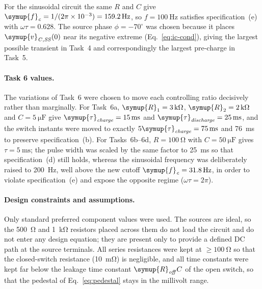 \documentclass[12pt,a4paper]{article}
\begin{document}
	For the sinusoidal circuit the same $R$ and $C$ give
	$\symup{f}_{\mathit{c}} = 1/(2\pi \times 10^{-3}) = \SI{159.2}{\hertz}$, so
	$f = \SI{100}{\hertz}$ satisfies specification~(e) with
	$\omega\tau = 0.628$.  The source phase $\phi = -70^{\circ}$ was chosen
	because it places $\symup{v}_{\mathit{C,SS}}(0)$ near its negative extreme
	(Eq.~\eqref{eq:ic-cond}), giving the largest possible transient in
	Task~4 and correspondingly the largest pre-charge in Task~5.
	
	\paragraph{Task 6 values.}
	The variations of Task~6 were chosen to move each controlling ratio
	decisively rather than marginally.  For Task~6a,
	$\symup{R}_{1} = \SI{3}{\kilo\ohm}$, $\symup{R}_{2} = \SI{2}{\kilo\ohm}$ and
	$C = \SI{5}{\micro\farad}$ give
	$\symup{\tau}_{\mathit{charge}} = \SI{15}{\milli\second}$ and
	$\symup{\tau}_{\mathit{discharge}} = \SI{25}{\milli\second}$, and the switch
	instants were moved to exactly $5\symup{\tau}_{\mathit{charge}} =
	\SI{75}{\milli\second}$ and \SI{76}{\milli\second} to preserve
	specification~(b).  For Tasks~6b--6d, $R = \SI{100}{\ohm}$ with
	$C = \SI{50}{\micro\farad}$ gives $\tau = \SI{5}{\milli\second}$; the
	pulse width was scaled by the same factor to
	\SI{25}{\milli\second} so that specification~(d) still holds, whereas
	the sinusoidal frequency was deliberately raised to
	\SI{200}{\hertz}, well above the new cutoff
	$\symup{f}_{\mathit{c}} = \SI{31.8}{\hertz}$, in order to violate
	specification~(e) and expose the opposite regime ($\omega\tau = 2\pi$).
	
	\paragraph{Design constraints and assumptions.}
	Only standard preferred component values were used.  The sources are
	ideal, so the \SI{500}{\ohm} and \SI{1}{\kilo\ohm} resistors placed
	across them do not load the circuit and do not enter any design
	equation; they are present only to provide a defined DC path at the
	source terminals.  All series resistances were kept at
	$\ge \SI{100}{\ohm}$ so that the closed-switch resistance
	(\SI{10}{\milli\ohm}) is negligible, and all time constants were kept
	far below the leakage time constant $\symup{R}_{\mathit{off}}C$ of the open
	switch, so that the pedestal of Eq.~\eqref{eq:pedestal} stays in the
	millivolt range.
	
\end{document}
